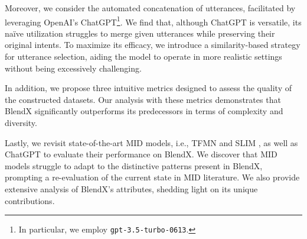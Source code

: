 Moreover, we consider the automated concatenation of utterances, facilitated by leveraging OpenAI's ChatGPT\footnote{In particular, we employ \texttt{gpt-3.5-turbo-0613}.}.
We find that, although ChatGPT is versatile, its na\"ive utilization struggles to merge  given utterances while preserving their original intents.
To maximize its efficacy, we introduce a similarity-based strategy for utterance selection, aiding the model to operate in more realistic settings without being excessively challenging.

In addition, we propose three intuitive metrics designed to assess the quality of the constructed datasets.
Our analysis with these metrics demonstrates that BlendX significantly outperforms its predecessors in terms of complexity and diversity.

Lastly, we revisit state-of-the-art MID models, i.e., TFMN \cite{chen-etal-2022-transformer} and SLIM \cite{9747477}, as well as ChatGPT to evaluate their performance on BlendX.
We discover that MID models struggle to adapt to the distinctive patterns present in BlendX, prompting a re-evaluation of the current state in MID literature.
We also provide extensive analysis of BlendX's attributes, shedding light on its unique contributions.